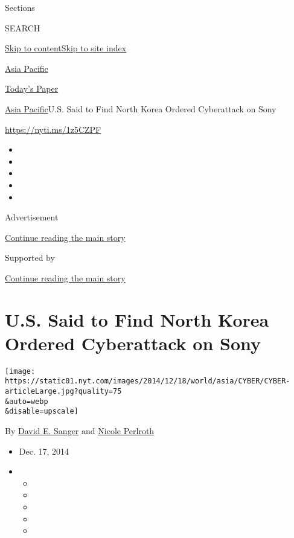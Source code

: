 Sections

SEARCH

\protect\hyperlink{site-content}{Skip to
content}\protect\hyperlink{site-index}{Skip to site index}

\href{https://www.nytimes.com/section/world/asia}{Asia Pacific}

\href{https://myaccount.nytimes.com/auth/login?response_type=cookie\&client_id=vi}{}

\href{https://www.nytimes.com/section/todayspaper}{Today's Paper}

\href{/section/world/asia}{Asia Pacific}\textbar{}U.S. Said to Find
North Korea Ordered Cyberattack on Sony

\url{https://nyti.ms/1z5CZPF}

\begin{itemize}
\item
\item
\item
\item
\item
\end{itemize}

Advertisement

\protect\hyperlink{after-top}{Continue reading the main story}

Supported by

\protect\hyperlink{after-sponsor}{Continue reading the main story}

\hypertarget{us-said-to-find-north-korea-ordered-cyberattack-on-sony}{%
\section{U.S. Said to Find North Korea Ordered Cyberattack on
Sony}\label{us-said-to-find-north-korea-ordered-cyberattack-on-sony}}

\texttt{[image: https://static01.nyt.com/images/2014/12/18/world/asia/CYBER/CYBER-articleLarge.jpg?quality=75\\\&auto=webp\\\&disable=upscale]}

By \href{http://www.nytimes.com/by/david-e-sanger}{David E. Sanger} and
\href{http://www.nytimes.com/by/nicole-perlroth}{Nicole Perlroth}

\begin{itemize}
\item
  Dec. 17, 2014
\item
  \begin{itemize}
  \item
  \item
  \item
  \item
  \item
  \end{itemize}
\end{itemize}

